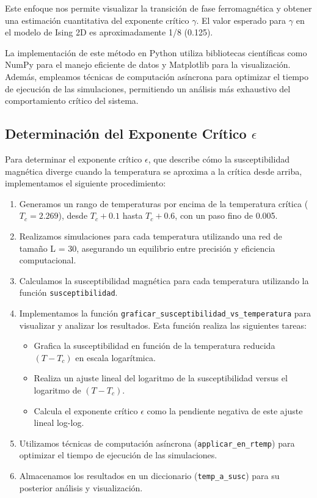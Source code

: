 \documentclass[twocolumn]{article}
\begin{document}
Este enfoque nos permite visualizar la transición de fase ferromagnética y obtener una estimación cuantitativa del exponente crítico $\gamma$. El valor esperado para $\gamma$ en el modelo de Ising 2D es aproximadamente 1/8 (0.125).

La implementación de este método en Python utiliza bibliotecas científicas como NumPy para el manejo eficiente de datos y Matplotlib para la visualización. Además, empleamos técnicas de computación asíncrona para optimizar el tiempo de ejecución de las simulaciones, permitiendo un análisis más exhaustivo del comportamiento crítico del sistema.

\subsection*{Determinación del Exponente Crítico $\epsilon$}

Para determinar el exponente crítico $\epsilon$, que describe cómo la susceptibilidad magnética diverge cuando la temperatura se aproxima a la crítica desde arriba, implementamos el siguiente procedimiento:

\begin{enumerate}
    \item Generamos un rango de temperaturas por encima de la temperatura crítica ($T_c = 2.269$), desde $T_c + 0.1$ hasta $T_c + 0.6$, con un paso fino de 0.005.
    
    \item Realizamos simulaciones para cada temperatura utilizando una red de tamaño L = 30, asegurando un equilibrio entre precisión y eficiencia computacional.
    
    \item Calculamos la susceptibilidad magnética para cada temperatura utilizando la función \texttt{susceptibilidad}.
    
    \item Implementamos la función \texttt{graficar\_susceptibilidad\_vs\_temperatura} para visualizar y analizar los resultados. Esta función realiza las siguientes tareas:
    \begin{itemize}
        \item Grafica la susceptibilidad en función de la temperatura reducida $(T - T_c)$ en escala logarítmica.
        \item Realiza un ajuste lineal del logaritmo de la susceptibilidad versus el logaritmo de $(T - T_c)$.
        \item Calcula el exponente crítico $\epsilon$ como la pendiente negativa de este ajuste lineal log-log.
    \end{itemize}

    \item Utilizamos técnicas de computación asíncrona (\texttt{applicar\_en\_rtemp}) para optimizar el tiempo de ejecución de las simulaciones.
    
    \item Almacenamos los resultados en un diccionario (\texttt{temp\_a\_susc}) para su posterior análisis y visualización.
\end{enumerate}
\end{document}
